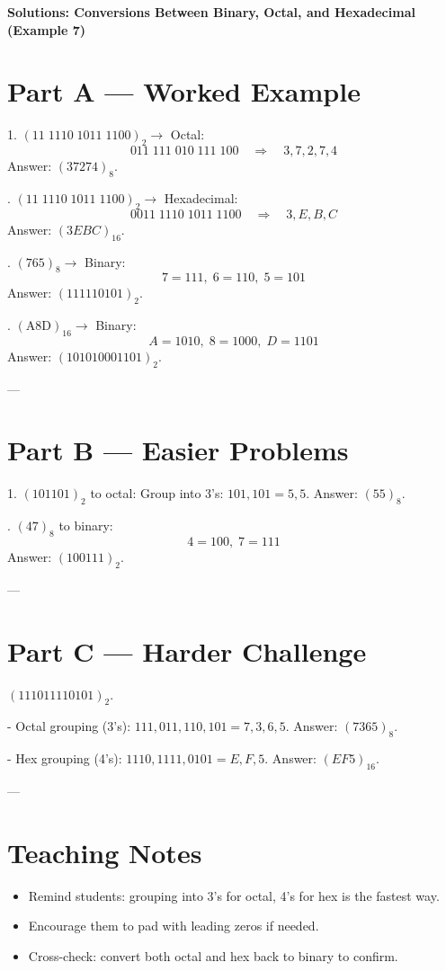\documentclass[12pt]{article}
\begin{document}
\begin{center}
\Large\textbf{Solutions: Conversions Between Binary, Octal, and Hexadecimal (Example 7)}
\end{center}

\section*{Part A — Worked Example}

1. $(11\;1110\;1011\;1100)_{2} \to$ Octal:  
\[
011\;111\;010\;111\;100 \quad \Rightarrow \quad 3,7,2,7,4
\]  
Answer: $(37274)_{8}$.

. $(11\;1110\;1011\;1100)_{2} \to$ Hexadecimal:  
\[
0011\;1110\;1011\;1100 \quad \Rightarrow \quad 3,E,B,C
\]  
Answer: $(3EBC)_{16}$.

. $(765)_{8} \to$ Binary:  
\[
7=111,\; 6=110,\; 5=101
\]  
Answer: $(111110101)_{2}$.

. $(\text{A8D})_{16} \to$ Binary:  
\[
A=1010,\; 8=1000,\; D=1101
\]  
Answer: $(101010001101)_{2}$.

---

\section*{Part B — Easier Problems}

1. $(101101)_{2}$ to octal:  
Group into 3’s: $101,101 = 5,5$.  
Answer: $(55)_{8}$.

. $(47)_{8}$ to binary:  
\[
4=100,\; 7=111
\]  
Answer: $(100111)_{2}$.

---

\section*{Part C — Harder Challenge}

$(111011110101)_{2}$.  

- Octal grouping (3’s): $111,011,110,101 = 7,3,6,5$.  
Answer: $(7365)_{8}$.  

- Hex grouping (4’s): $1110,1111,0101 = E,F,5$.  
Answer: $(EF5)_{16}$.

---

\section*{Teaching Notes}
\begin{itemize}
  \item Remind students: grouping into 3’s for octal, 4’s for hex is the fastest way.  
  \item Encourage them to pad with leading zeros if needed.  
  \item Cross-check: convert both octal and hex back to binary to confirm.  
\end{itemize}
\end{document}
